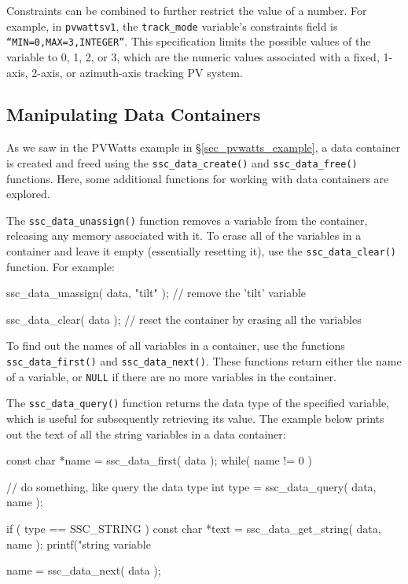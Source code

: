 \documentclass{scrartcl} %
\begin{document}
Constraints can be combined to further restrict the value of a number.  For example, in \texttt{pvwattsv1}, the \texttt{track\_mode} variable's constraints field is \texttt{``MIN=0,MAX=3,INTEGER''}.  This specification limits the possible values of the variable to 0, 1, 2, or 3, which are the numeric values associated with a fixed, 1-axis, 2-axis, or azimuth-axis tracking PV system.

\subsection{Manipulating Data Containers}
\label{sec_data_manip}

As we saw in the PVWatts example in \S\ref{sec_pvwatts_example}, a data container is created and freed using the \texttt{ssc\_data\_create()} and \texttt{ssc\_data\_free()} functions.  Here, some additional functions for working with data containers are explored.

The \texttt{ssc\_data\_unassign()} function removes a variable from the container, releasing any memory associated with it.  To erase all of the variables in a container and leave it empty (essentially resetting it), use the \texttt{ssc\_data\_clear()} function.  For example:

\begin{verbatimtab}
ssc_data_unassign( data, "tilt" ); // remove the 'tilt' variable

ssc_data_clear( data ); // reset the container by erasing all the variables
\end{verbatimtab}

To find out the names of all variables in a container, use the functions \texttt{ssc\_data\_first()} and \texttt{ssc\_data\_next()}.  These functions return either the name of a variable, or \texttt{NULL} if there are no more variables in the container. 

The \texttt{ssc\_data\_query()} function returns the data type of the specified variable, which is useful for subsequently retrieving its value.  The example below prints out the text of all the string variables in a data container:

\begin{verbatimtab}[4]
const char *name = ssc_data_first( data );
while( name != 0 )
{
	// do something, like query the data type
	int type = ssc_data_query( data, name );

	if ( type == SSC_STRING )
	{
		const char *text = ssc_data_get_string( data, name );
		printf("string variable %
	}

	name = ssc_data_next( data );
}
\end{verbatimtab}
\end{document}
